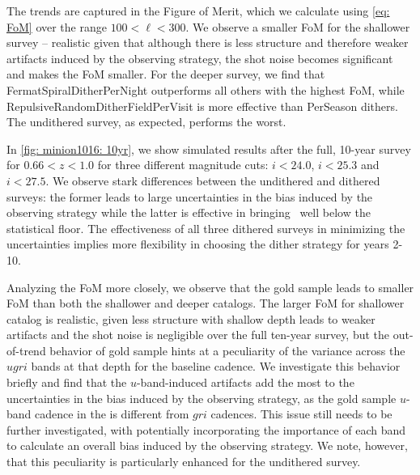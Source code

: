 The trends are captured in the Figure of Merit, which we calculate using \autoref{eq: FoM} over the range $100<\ell<300$. We observe a smaller FoM for the shallower survey -- realistic given that although there is less structure and therefore weaker artifacts induced by the observing strategy, the shot noise becomes significant and makes the FoM smaller. For the deeper survey, we find that FermatSpiralDitherPerNight outperforms all others with the highest FoM, while RepulsiveRandomDitherFieldPerVisit is more effective than PerSeason dithers. The undithered survey, as expected, performs the worst.

In \autoref{fig: minion1016: 10yr}, we show simulated results after the full, 10-year survey for $0.66<z<1.0$ for three different magnitude cuts: $i<24.0$, $i<25.3$ and $i<27.5$. We observe stark differences between the undithered and dithered surveys: the former leads to large uncertainties in the bias induced by the observing strategy while the latter is effective in bringing \sigmaOS\ well below the statistical floor. The effectiveness of all three dithered surveys in minimizing the uncertainties implies more flexibility in choosing the dither strategy for years 2-10.


Analyzing the FoM more closely, we observe that the gold sample leads to smaller FoM than both the shallower and deeper catalogs. The larger FoM for shallower catalog is realistic, given less structure with shallow depth leads to weaker artifacts and the shot noise is negligible over the full ten-year survey, but the out-of-trend behavior of gold sample hints at a peculiarity of the variance across the $ugri$ bands at that depth for the baseline cadence. We investigate this behavior briefly and find that the $u$-band-induced artifacts add the most to the uncertainties in the bias induced by the observing strategy, as the gold sample $u$-band cadence in the  is different from $gri$ cadences. This issue still needs to be further investigated, with potentially incorporating the importance of each band to calculate an overall bias induced by the observing strategy. We note, however, that this peculiarity is particularly enhanced for the undithered survey.

